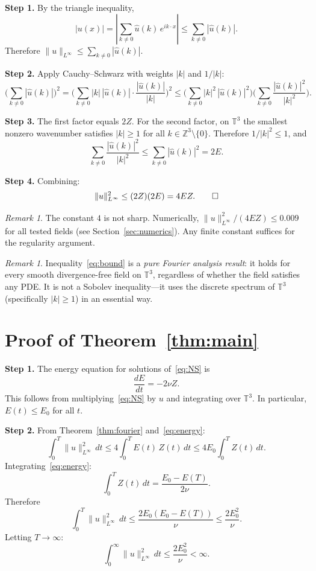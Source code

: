 \documentclass[11pt]{article}
\theoremstyle{definition}
\theoremstyle{remark}
\newtheorem{remark}[theorem]{Remark}
\begin{document}
\textbf{Step 1.} By the triangle inequality,
\[
  |u(x)| = \left|\sum_{k \neq 0} \hat{u}(k)\,e^{ik \cdot x}\right|
  \le \sum_{k \neq 0} |\hat{u}(k)|.
\]
Therefore $\|u\|_{L^\infty} \le \sum_{k \neq 0} |\hat{u}(k)|$.

\textbf{Step 2.} Apply Cauchy--Schwarz with weights $|k|$ and
$1/|k|$:
\[
  \biggl(\sum_{k \neq 0} |\hat{u}(k)|\biggr)^2
  = \biggl(\sum_{k \neq 0} |k|\,|\hat{u}(k)| \cdot \frac{|\hat{u}(k)|}{|k|}\biggr)^2
  \le \biggl(\sum_{k \neq 0} |k|^2\,|\hat{u}(k)|^2\biggr)
       \biggl(\sum_{k \neq 0} \frac{|\hat{u}(k)|^2}{|k|^2}\biggr).
\]

\textbf{Step 3.} The first factor equals $2Z$. For the second
factor, on $\mathbb{T}^3$ the smallest nonzero wavenumber satisfies
$|k| \ge 1$ for all $k \in \mathbb{Z}^3 \setminus \{0\}$.
Therefore $1/|k|^2 \le 1$, and
\[
  \sum_{k \neq 0} \frac{|\hat{u}(k)|^2}{|k|^2}
  \le \sum_{k \neq 0} |\hat{u}(k)|^2 = 2E.
\]

\textbf{Step 4.} Combining:
\[
  \|u\|_{L^\infty}^2 \le (2Z)(2E) = 4EZ. \qedhere
\]

\begin{remark}
The constant $4$ is not sharp. Numerically, $\|u\|_{L^\infty}^2 /
(4EZ) \le 0.009$ for all tested fields (see
Section~\ref{sec:numerics}). Any finite constant suffices for the
regularity argument.
\end{remark}

\begin{remark}
Inequality~\eqref{eq:bound} is a \emph{pure Fourier analysis
result}: it holds for every smooth divergence-free field on
$\mathbb{T}^3$, regardless of whether the field satisfies any
PDE. It is not a Sobolev inequality---it uses the discrete
spectrum of $\mathbb{T}^3$ (specifically $|k| \ge 1$) in an
essential way.
\end{remark}

\section{Proof of Theorem~\ref{thm:main}}

\textbf{Step 1.} The energy equation for solutions of~\eqref{eq:NS}
is
\begin{equation}\label{eq:energy}
  \frac{dE}{dt} = -2\nu Z.
\end{equation}
This follows from multiplying~\eqref{eq:NS} by $u$ and integrating
over $\mathbb{T}^3$. In particular, $E(t) \le E_0$ for all $t$.

\textbf{Step 2.} From Theorem~\ref{thm:fourier} and~\eqref{eq:energy}:
\[
  \int_0^T \|u\|_{L^\infty}^2\,dt
  \le 4\int_0^T E(t)\,Z(t)\,dt
  \le 4E_0 \int_0^T Z(t)\,dt.
\]
Integrating~\eqref{eq:energy}:
\[
  \int_0^T Z(t)\,dt = \frac{E_0 - E(T)}{2\nu}.
\]
Therefore
\[
  \int_0^T \|u\|_{L^\infty}^2\,dt
  \le \frac{2E_0(E_0 - E(T))}{\nu}
  \le \frac{2E_0^2}{\nu}.
\]
Letting $T \to \infty$:
\begin{equation}\label{eq:ps}
  \int_0^\infty \|u\|_{L^\infty}^2\,dt \le \frac{2E_0^2}{\nu} < \infty.
\end{equation}
\end{document}
